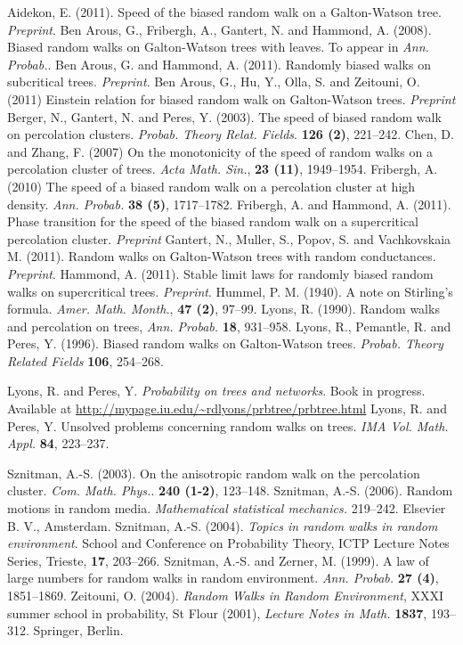\documentclass[12pt]{amsart}
\numberwithin{equation}{section}
\begin{document}
\begin{thebibliography}{99}
 Aidekon, E. (2011). Speed of the biased random walk on a Galton-Watson tree. {\it Preprint}.
    Ben Arous, G., Fribergh, A., Gantert, N. and Hammond, A. (2008). Biased random walks on Galton-Watson trees with leaves. To appear in {\it Ann. Probab.}.
    Ben Arous, G. and Hammond, A. (2011). Randomly biased walks on subcritical trees. {\it Preprint}.
     Ben Arous, G., Hu, Y., Olla, S. and Zeitouni, O. (2011) Einstein relation for biased random walk on Galton-Watson trees. {\it Preprint}
    Berger, N., Gantert, N. and Peres, Y. (2003). The speed of biased random walk on percolation clusters. {\it Probab. Theory Relat. Fields}. {\bf 126 (2)}, 221--242.
   Chen, D. and Zhang, F. (2007) On the monotonicity of the speed of random walks on a percolation cluster of trees. {\it Acta Math. Sin.}, {\bf  23 (11)}, 1949--1954.
  Fribergh, A. (2010) The speed of a biased random walk on a percolation cluster at high density. {\it Ann. Probab.} {\bf 38 (5)}, 1717--1782.
   Fribergh, A. and Hammond, A. (2011). Phase transition for the speed of the biased random walk on a supercritical percolation cluster. {\it Preprint}
   Gantert, N., Muller, S., Popov, S. and Vachkovskaia M. (2011). Random walks on Galton-Watson trees with random conductances. {\it Preprint}.
   Hammond, A. (2011). Stable limit laws for randomly biased random walks on supercritical trees. {\it Preprint}.
  Hummel, P. M. (1940). A note on Stirling's formula. {\it Amer. Math. Month.}, {\bf 47 (2)}, 97--99.
  Lyons, R. (1990). Random walks and percolation on trees, {\it Ann. Probab.} {\bf 18}, 931--958.
   Lyons, R., Pemantle, R. and Peres, Y. (1996). Biased random walks on Galton-Watson trees. {\it Probab. Theory Related Fields} {\bf 106}, 254--268.
 
   Lyons, R. and Peres, Y. {\it Probability on trees and networks}. Book in progress. Available at \url{http://mypage.iu.edu/~rdlyons/prbtree/prbtree.html}
  Lyons, R. and Peres, Y. Unsolved problems concerning random walks on trees.
   {\it IMA Vol. Math. Appl.} {\bf 84}, 223--237.
 
  Sznitman, A.-S. (2003). On the anisotropic random walk on the percolation cluster. {\it Com. Math. Phys.}. {\bf 240 (1-2)}, 123--148.
 Sznitman, A.-S. (2006). Random motions in random media. {\it Mathematical statistical mechanics.} 219--242. Elsevier B. V., Amsterdam.
    Sznitman, A.-S. (2004). {\it Topics in random walks in random environment}. School and Conference on Probability Theory, ICTP Lecture Notes Series, Trieste, {\bf 17}, 203--266.
 Sznitman, A.-S. and Zerner, M. (1999). A law of large numbers for random walks in random environment. {\it Ann. Probab.} {\bf 27 (4)}, 1851--1869.
   Zeitouni, O. (2004). {\it Random Walks in Random Environment}, XXXI summer school in probability, St Flour (2001),  {\it Lecture Notes in Math.} {\bf 1837}, 193--312. Springer, Berlin.
\end{thebibliography}
\end{document}
